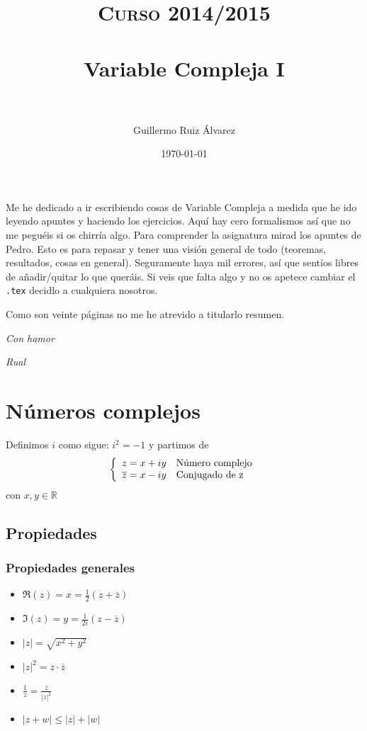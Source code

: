 \documentclass[paper=a4, fontsize=11pt]{scrartcl}
\title{	
\normalfont \normalsize 
\textsc{Curso 2014/2015} \\ [25pt] 
\horrule{2pt} \\[0.5cm] 
\huge Variable Compleja I\\ 
\horrule{2pt} \\[0.5cm] 
}
\author{Guillermo Ruiz Álvarez}
\date{\normalsize\today}
\numberwithin{equation}{section}
\numberwithin{figure}{section}
\numberwithin{table}{section}
\begin{document}
\maketitle 

Me he dedicado a ir escribiendo cosas de Variable Compleja a medida que he ido leyendo apuntes y haciendo los ejercicios. Aquí hay cero formalismos así que no me peguéis si os chirría algo. Para comprender la asignatura mirad los apuntes de Pedro. Esto es para repasar y tener una visión general de todo (teoremas, resultados, cosas en general). Seguramente haya mil errores, así que sentíos libres de añadir/quitar lo que queráis. Si veis que falta algo y no os apetece cambiar el \texttt{.tex} decidlo a cualquiera nosotros.

Como son veinte páginas no me he atrevido a titularlo resumen.
\begin{flushright}
\textit{Con hamor}

\textit{Rual}
\end{flushright}

\tableofcontents

\newpage
{}
\section{Números complejos}
Definimos $i$ como sigue: $\boxed{i^2=-1}$ y partimos de
\begin{equation*}
\left\{
\begin{array}{l l}
z=x+iy & \text{Número complejo}\\
\overline{z}=x-iy & \text{Conjugado de } $z$
\end{array}
\right.
\end{equation*}
con $x,y \in \mathbb{R}$

\subsection{Propiedades}

\subsubsection{Propiedades generales}\mbox{}

\begin{itemize}
\item $\Re(z)=x=\frac{1}{2}(z+\overline{z})$
\item $\Im(z)=y=\frac{1}{2i}(z-\overline{z})$
\item $|z|=\sqrt{x^2+y^2}$
\item $|z|^2=z\cdot\overline{z}$
\item $\frac{1}{z}=\frac{\overline{z}}{|z|^2}$
\item $|z+w|\le|z|+|w|$
\end{itemize}
\end{document}

